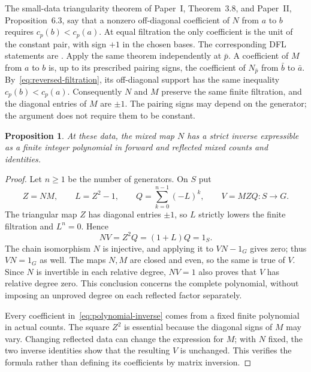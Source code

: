 \documentclass[11pt]{amsart}
\newtheorem{proposition}[theorem]{Proposition}
\theoremstyle{definition}
\theoremstyle{remark}
\theoremstyle{plain}
\begin{document}
The small-data triangularity theorem of Paper~I, Theorem~3.8,
and Paper~II, Proposition~6.3, say that a nonzero
off-diagonal coefficient of $N$ from $a$ to $b$ requires
$c_p(b)<c_p(a)$. At equal filtration the only coefficient is
the unit of the constant pair, with sign $+1$ in the chosen
bases. The corresponding DFL statements are
\cite[Proposition~3.23(iii) and the proof of Theorem~3.29]{DFL}.
Apply the same theorem independently at $\bar p$.
A coefficient of $M$ from $a$ to $b$ is, up to its prescribed
pairing signs, the coefficient of $N_{\bar p}$ from $\bar b$
to $\bar a$. By~\eqref{eq:reversed-filtration}, its off-diagonal
support has the same inequality $c_p(b)<c_p(a)$.
Consequently $N$ and $M$ preserve the same finite filtration,
and the diagonal entries of $M$ are $\pm1$. The pairing signs
may depend on the generator; the argument does not require
them to be constant.

\begin{proposition}\label{prop:count-inverse}
At these data, the mixed map $N$ has a strict inverse expressible
as a finite integer polynomial in forward and reflected mixed
counts and identities.
\end{proposition}
\begin{proof}
Let $n\ge1$ be the number of generators. On $S$ put
\begin{equation}\label{eq:polynomial-inverse}
 Z=NM,\qquad L=Z^2-1,\qquad
 Q=\sum_{k=0}^{n-1}(-L)^k,\qquad V=MZQ:S\longrightarrow G.
\end{equation}
The triangular map $Z$ has diagonal entries $\pm1$, so $L$
strictly lowers the finite filtration and $L^n=0$. Hence
\[
 NV=Z^2Q=(1+L)Q=1_S.
\]
The chain isomorphism $N$ is injective, and applying it to
$VN-1_G$ gives zero; thus $VN=1_G$ as well. The maps $N,M$
are closed and even, so the same is true of $V$. Since $N$
is invertible in each relative degree, $NV=1$ also proves
that $V$ has relative degree zero. This conclusion concerns
the complete polynomial, without imposing an unproved degree
on each reflected factor separately.

Every coefficient in~\eqref{eq:polynomial-inverse} comes from
a fixed finite polynomial in actual counts. The square $Z^2$
is essential because the diagonal signs of $M$ may vary.
Changing reflected data can change the expression for $M$;
with $N$ fixed, the two inverse identities show that the
resulting $V$ is unchanged. This verifies the formula rather
than defining its coefficients by matrix inversion.
\end{proof}
\end{document}
